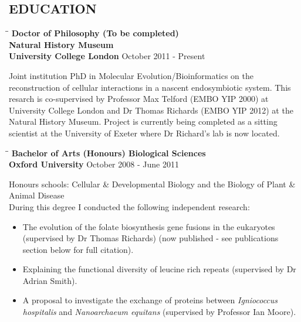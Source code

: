 \documentclass{res}
\begin{document}
\begin{resume}
        
\section{EDUCATION}          

\vspace{-0.05in}
\begin{tabbing}
   \hspace{2in}\= \hspace{2.6in}\= \kill 
    {\bf Doctor of Philosophy (To be completed)}\\ 
    {\bf Natural History Museum}\\
    {\bf University College London
    } \>      \>October 2011 - Present\\

   \end{tabbing}\vspace{-20pt}  
   
   Joint institution PhD in Molecular Evolution/Bioinformatics on the reconstruction of cellular interactions in a nascent endosymbiotic system.  This resarch is co-supervised by Professor Max Telford (EMBO YIP 2000) at University College London and Dr Thomas Richards (EMBO YIP 2012) at the Natural History Museum.  Project is currently being completed as a sitting scientist at the University of Exeter where Dr Richard's lab is now located.

\vspace{-0.1in}
 \begin{tabbing}
   \hspace{2in}\= \hspace{2.6in}\= \kill 
    {\bf Bachelor of Arts (Honours) Biological Sciences}\\
    {\bf Oxford University
    } \>      \>October 2008 - June 2011\\
                          

   \end{tabbing}\vspace{-20pt}  
Honours schools: Cellular \& Developmental Biology and the Biology of Plant \& Animal Disease\\
During this degree I conducted the following independent research:
\begin{itemize}
        \vspace{-10pt}
    \item The evolution of the folate biosynthesis gene fusions in the eukaryotes (supervised by Dr Thomas Richards) (now published - see publications section below for full citation).
    \item Explaining the functional diversity of leucine rich repeats (supervised by Dr Adrian Smith).
    \item A proposal to investigate the exchange of proteins between  \emph{Igniococcus hospitalis} and  \emph{Nanoarchaeum equitans} (supervised by Professor Ian Moore).
\end{itemize}



\end{resume}
\end{document}
